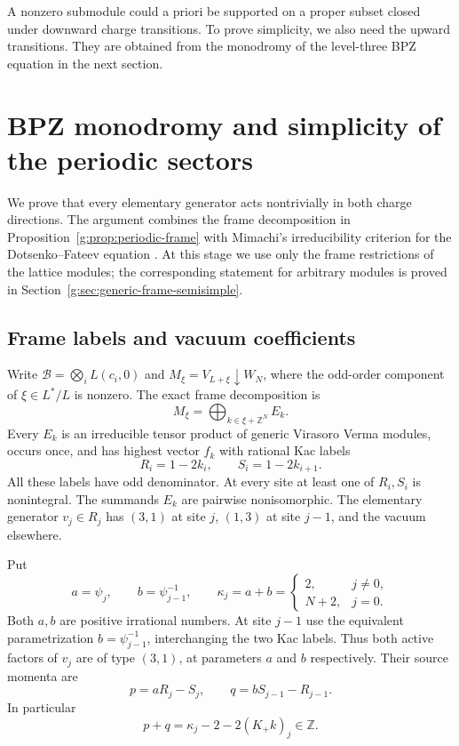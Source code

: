 \documentclass[11pt,a4paper]{article}
\numberwithin{equation}{section}
\theoremstyle{definition}\newtheorem{definition}[theorem]{Definition}
\theoremstyle{remark}\newtheorem{remark}[theorem]{Remark}
\begin{document}
A nonzero submodule could a priori be supported on a proper subset
closed under downward charge transitions.  To prove simplicity, we
also need the upward transitions.  They are obtained from the
monodromy of the level-three BPZ equation in the next section.

\section{BPZ monodromy and simplicity of the periodic sectors}
\label{g:sec:bpz-periodic-simplicity}

We prove that every elementary generator acts nontrivially in both
charge directions.  The argument combines the frame decomposition in
Proposition~\ref{g:prop:periodic-frame} with Mimachi's irreducibility
criterion for the Dotsenko--Fateev equation
\cite[Theorem 11]{mimachi}.  At this stage we use only the frame
restrictions of the lattice modules; the corresponding statement for
arbitrary modules is proved in Section~\ref{g:sec:generic-frame-semisimple}.

\subsection{Frame labels and vacuum coefficients}
Write $\mathcal B=\bigotimes_iL(c_i,0)$ and
$M_\xi=V_{L+\xi}\downarrow W_N$, where the odd-order component of
$\xi\in L^*/L$ is nonzero. The exact frame decomposition is
\[
 M_\xi=\bigoplus_{k\in\xi+\mathbb Z^N}E_k.
\]
Every $E_k$ is an irreducible tensor product of generic Virasoro Verma
modules, occurs once, and has highest vector $f_k$ with rational Kac labels
\[
 R_i=1-2k_i,\qquad S_i=1-2k_{i+1}.
\]
All these labels have odd denominator. At every site at least one of
$R_i,S_i$ is nonintegral. The summands $E_k$ are pairwise nonisomorphic.
The elementary generator $v_j\in R_j$ has $(3,1)$ at site $j$,
$(1,3)$ at site $j-1$, and the vacuum elsewhere.

Put
\[
 a=\psi_j,\qquad b=\psi_{j-1}^{-1},\qquad
 \kappa_j=a+b=\begin{cases}2,&j\ne0,\\N+2,&j=0.\end{cases}
\]
Both $a,b$ are positive irrational numbers. At site $j-1$ use the
equivalent parametrization $b=\psi_{j-1}^{-1}$, interchanging the two
Kac labels. Thus both active factors of $v_j$ are of type $(3,1)$,
at parameters $a$ and $b$ respectively. Their source momenta are
\[
 p=aR_j-S_j,\qquad q=bS_{j-1}-R_{j-1}.
\]
In particular
\[
 p+q=\kappa_j-2-2(K_+k)_j\in\mathbb Z.
\]
\end{document}
